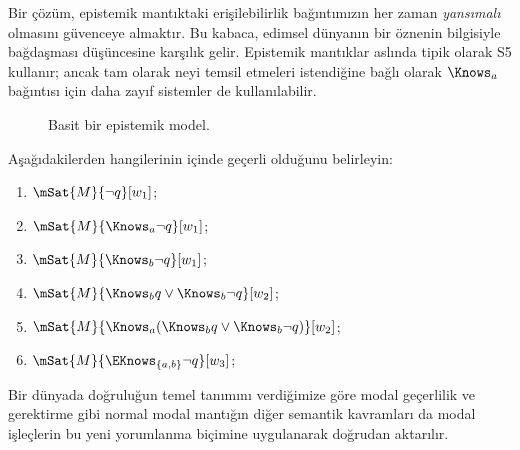 Bir çözüm, epistemik mantıktaki erişilebilirlik bağıntımızın her zaman
\emph{yansımalı} olmasını güvenceye almaktır. Bu kabaca, edimsel dünyanın bir
öznenin bilgisiyle bağdaşması düşüncesine karşılık gelir. Epistemik mantıklar
aslında tipik olarak S5 kullanır; ancak tam olarak neyi temsil etmeleri
istendiğine bağlı olarak $\Knows_a$ bağıntısı için daha zayıf sistemler de
kullanılabilir.

\begin{figure}
  \begin{center}
  \end{center}
  \caption{Basit bir epistemik model.}
\end{figure}

\begin{prob}
  Aşağıdakilerden hangilerinin  içinde
  geçerli olduğunu belirleyin:
  \begin{enumerate}
    \item $\mSat{M}{\lnot q}[w_1]$;
    \item $\mSat{M}{\Knows_a \lnot q}[w_1]$;
    \item $\mSat{M}{\Knows_b \lnot q}[w_1]$;
    \item $\mSat{M}{\Knows_b q \lor \Knows_b \lnot q}[w_2]$;
    \item $\mSat{M}{\Knows_a( \Knows_b q \lor \Knows_b \lnot q)}[w_2]$;
    \item $\mSat{M}{\EKnows_{\{a,b\}} \lnot q}[w_3]$;
    \end{enumerate}
\end{prob}

Bir dünyada doğruluğun temel tanımını verdiğimize göre modal geçerlilik ve
gerektirme gibi normal modal mantığın diğer semantik kavramları da modal
işleçlerin bu yeni yorumlanma biçimine uygulanarak doğrudan aktarılır.

